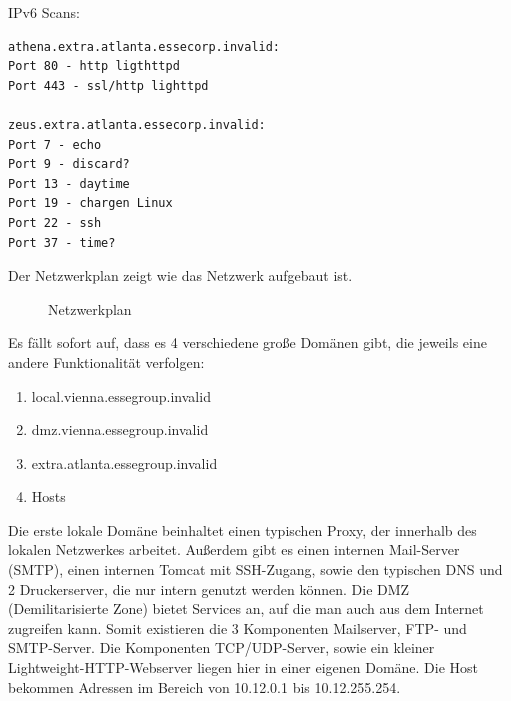 IPv6 Scans:
\begin{lstlisting}
athena.extra.atlanta.essecorp.invalid:
Port 80 - http ligthttpd
Port 443 - ssl/http lighttpd

zeus.extra.atlanta.essecorp.invalid:
Port 7 - echo
Port 9 - discard?
Port 13 - daytime
Port 19 - chargen Linux
Port 22 - ssh
Port 37 - time?
\end{lstlisting}

Der Netzwerkplan zeigt wie das Netzwerk aufgebaut ist.

\begin{figure}[h!]
  \centering
  \caption{Netzwerkplan}
  \label{fig:netzwerkplan}
\end{figure}

Es fällt sofort auf, dass es 4 verschiedene große Domänen gibt, die jeweils eine andere Funktionalität verfolgen:
\begin{enumerate}
\item local.vienna.essegroup.invalid
\item dmz.vienna.essegroup.invalid
\item extra.atlanta.essegroup.invalid
\item Hosts
\end{enumerate}

Die erste lokale Domäne beinhaltet einen typischen Proxy, der innerhalb des lokalen Netzwerkes arbeitet. Außerdem gibt es einen
internen Mail-Server (SMTP), einen internen Tomcat mit SSH-Zugang, sowie den typischen DNS und 2 Druckerserver, die
nur intern genutzt werden können.\linebreak
Die DMZ (Demilitarisierte Zone) bietet Services an, auf die man auch aus dem Internet zugreifen kann. Somit existieren die
3 Komponenten Mailserver, FTP- und SMTP-Server.\linebreak
Die Komponenten TCP/UDP-Server, sowie ein kleiner Lightweight-HTTP-Webserver liegen hier in einer eigenen Domäne.\linebreak
Die Host bekommen Adressen im Bereich von 10.12.0.1 bis 10.12.255.254.
